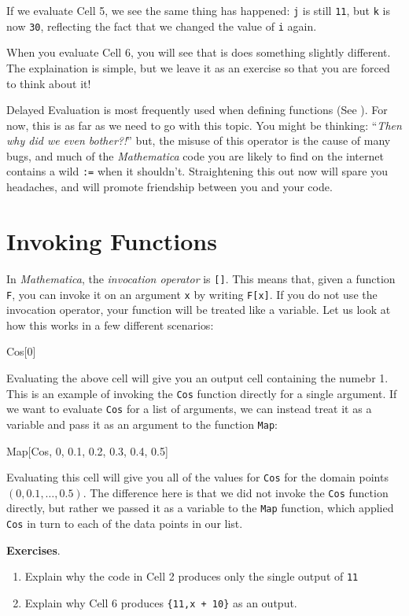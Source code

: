 If we evaluate Cell 5, we see the same thing has happened: \texttt{j} is still \texttt{11}, but \texttt{k} is now \texttt{30}, reflecting the fact that we changed the value of \texttt{i} again.

When you evaluate Cell 6, you will see that is does something slightly different. The explaination is simple, but we leave it as an exercise so that you are forced to think about it!

Delayed Evaluation is most frequently used when defining functions (See ). For now, this is as far as we need to go with this topic. You might be thinking: ``\emph{Then why did we even bother?!}'' but, the misuse of this operator is the cause of many bugs, and much of the \emph{Mathematica} code you are likely to find on the internet contains a wild \texttt{:=} when it shouldn't. Straightening this out now will spare you headaches, and will promote friendship between you and your code.

\section{Invoking Functions}

In \emph{Mathematica}, the \emph{invocation operator} is \texttt{[]}. This means that, given a function \texttt{F}, you can invoke it on an argument \texttt{x} by writing \texttt{F[x]}. If you do not use the invocation operator, your function will be treated like a variable. Let us look at how this works in a few different scenarios:

\begin{code}
	   Cos[0]
\end{code}

Evaluating the above cell will give you an output cell containing the numebr 1. This is an example of invoking the \texttt{Cos} function directly for a single argument. If we want to evaluate \texttt{Cos} for a list of arguments, we can instead treat it as a variable and pass it as an argument to the function \texttt{Map}:

\begin{code}
	   Map[Cos, {0, 0.1, 0.2, 0.3, 0.4, 0.5}]
\end{code}

Evaluating this cell will give you all of the values for \texttt{Cos} for the domain points $(0, 0.1, \dots, 0.5)$. The difference here is that we did not invoke the \texttt{Cos} function directly, but rather we passed it as a variable to the \texttt{Map} function, which applied \texttt{Cos} in turn to each of the data points in our list. 

{\bf Exercises}. 
\begin{enumerate}
	   \item Explain why the code in Cell 2 produces only the single output of \texttt{11}
	   \item Explain why Cell 6 produces \texttt{\{11,x + 10\}} as an output.
\end{enumerate}
